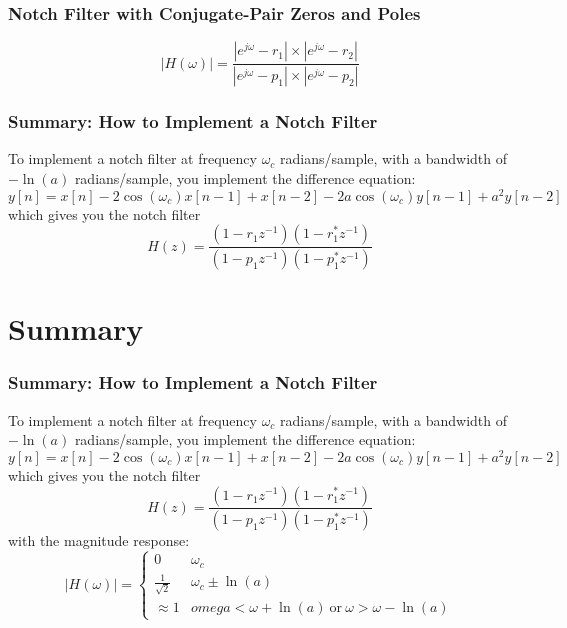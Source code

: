 \documentclass{beamer}
\begin{document}
\begin{frame}
  \frametitle{Notch Filter with Conjugate-Pair Zeros and Poles}
  \begin{displaymath}
    |H(\omega)|=\frac{|e^{j\omega}-r_1|\times|e^{j\omega}-r_2|}{|e^{j\omega}-p_1|\times|e^{j\omega}-p_2|}
  \end{displaymath}
  \centerline{}
\end{frame}

\begin{frame}
  \frametitle{Summary: How to Implement a Notch Filter}

  To implement a notch filter at frequency $\omega_c$ radians/sample,
  with a bandwidth of $-\ln(a)$ radians/sample, you implement the difference equation:
  \begin{displaymath}
    y[n] = x[n]-2\cos(\omega_c)x[n-1]+x[n-2]-2a\cos(\omega_c)y[n-1]+a^2y[n-2]
  \end{displaymath}
  which gives you the notch filter
  \begin{displaymath}
    H(z) = \frac{(1-r_1z^{-1})(1-r_1^*z^{-1})}{(1-p_1z^{-1})(1-p_1^*z^{-1})}
  \end{displaymath}
\end{frame}

\section[Summary]{Summary}
\setcounter{subsection}{1}
  
\begin{frame}
  \frametitle{Summary: How to Implement a Notch Filter}

  To implement a notch filter at frequency $\omega_c$ radians/sample,
  with a bandwidth of $-\ln(a)$ radians/sample, you implement the difference equation:
  \begin{displaymath}
    y[n] = x[n]-2\cos(\omega_c)x[n-1]+x[n-2]-2a\cos(\omega_c)y[n-1]+a^2y[n-2]
  \end{displaymath}
  which gives you the notch filter
  \begin{displaymath}
    H(z) = \frac{(1-r_1z^{-1})(1-r_1^*z^{-1})}{(1-p_1z^{-1})(1-p_1^*z^{-1})}
  \end{displaymath}
  with the magnitude response:
  \begin{displaymath}
    |H(\omega)| =\begin{cases}
    0 & \omega_c\\
    \frac{1}{\sqrt{2}} & \omega_c \pm \ln(a)\\
    \approx 1 & omega < \omega+\ln(a)~\mbox{or}~\omega > \omega-\ln(a)
    \end{cases}
  \end{displaymath}
\end{frame}
\end{document}
